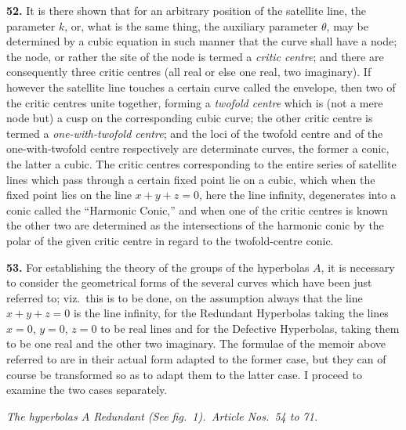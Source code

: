 \documentclass[11pt,a4paper]{article}
\begin{document}
\medskip

\textbf{52.} It is there shown that for an arbitrary position of the satellite line, the parameter $k$, or, what is the same thing, the auxiliary parameter $\theta$, may be determined by a cubic equation in such manner that the curve shall have a node; the node, or rather the site of the node is termed a \emph{critic centre}; and there are consequently three critic centres (all real or else one real, two imaginary). If however the satellite line touches a certain curve called the envelope, then two of the critic centres unite together, forming a \emph{twofold centre} which is (not a mere node but) a cusp on the corresponding cubic curve; the other critic centre is termed a \emph{one-with-twofold centre}; and the loci of the twofold centre and of the one-with-twofold centre respectively are determinate curves, the former a conic, the latter a cubic. The critic centres corresponding to the entire series of satellite lines which pass through a certain fixed point lie on a cubic, which when the fixed point lies on the line $x+y+z=0$, here the line infinity, degenerates into a conic called the ``Harmonic Conic,'' and when one of the critic centres is known the other two are determined as the intersections of the harmonic conic by the polar of the given critic centre in regard to the twofold-centre conic.

\medskip

\textbf{53.} For establishing the theory of the groups of the hyperbolas $A$, it is necessary to consider the geometrical forms of the several curves which have been just referred to; viz.\ this is to be done, on the assumption always that the line $x+y+z=0$ is the line infinity, for the Redundant Hyperbolas taking the lines $x=0$, $y=0$, $z=0$ to be real lines and for the Defective Hyperbolas, taking them to be one real and the other two imaginary. The formulae of the memoir above referred to are in their actual form adapted to the former case, but they can of course be transformed so as to adapt them to the latter case. I proceed to examine the two cases separately.

\medskip

\noindent\textit{The hyperbolas $A$ Redundant (See fig.\ 1).\ Article Nos.\ 54 to 71.}

\medskip
\end{document}

